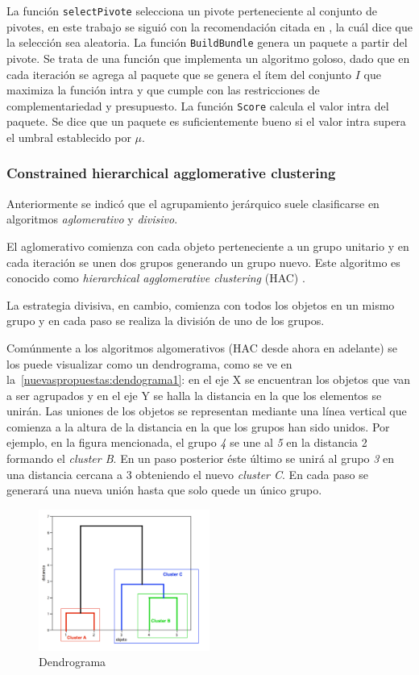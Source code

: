 La función \texttt{selectPivote} selecciona un pivote perteneciente al conjunto de pivotes, en este trabajo se siguió con la recomendación citada en \cite{Zhang:2002:ESI:638644.638646}, la cuál dice que la selección sea aleatoria. La función \texttt{BuildBundle} genera un paquete a partir del pivote. Se trata de una función que implementa un algoritmo goloso, dado que en cada iteración se agrega al paquete que se genera el ítem del conjunto $I$ que maximiza la función intra y que cumple con las restricciones de complementariedad y presupuesto. La función \texttt{Score} calcula el valor intra del paquete. Se dice que un paquete es suficientemente bueno si el valor intra supera el umbral establecido por $\mu$.

\subsubsection{Constrained hierarchical agglomerative clustering}
Anteriormente se indicó que el agrupamiento jerárquico suele clasificarse en algoritmos \textit{aglomerativo} y \textit{divisivo}. 

El aglomerativo comienza con cada objeto perteneciente a un grupo unitario y en cada iteración se unen dos grupos generando un grupo nuevo. Este algoritmo es conocido como \textit{hierarchical agglomerative clustering} (HAC) \cite{journals/tkde/Amer-YahiaBCFMZ14}. 

La estrategia divisiva, en cambio, comienza con todos los objetos en un mismo grupo y en cada paso se realiza la división de uno de los grupos.

Comúnmente a los algoritmos algomerativos (HAC desde ahora en adelante) se los puede visualizar como un dendrograma, como se ve en la~\autoref{nuevaspropuestas:dendograma1}: en el eje X se encuentran los objetos que van a ser agrupados y en el eje Y se halla la distancia en la que los elementos se unirán. Las uniones de los objetos se representan mediante una línea vertical que comienza a la altura de la distancia en la que los grupos han sido unidos. Por ejemplo, en la figura mencionada, el grupo \textit{4} se une al \textit{5} en la distancia 2 formando el \textit{cluster B}. En un paso posterior éste último se unirá al grupo \textit{3} en una distancia cercana a 3 obteniendo el nuevo \textit{cluster C}. En cada paso se generará una nueva unión hasta que solo quede un único grupo.

\begin{figure}[H]
  \centering
    \includegraphics[width=0.5\textwidth]{img/dendograma01.png}
  \caption{Dendrograma}
  \label{nuevaspropuestas:dendograma1}
\end{figure}

